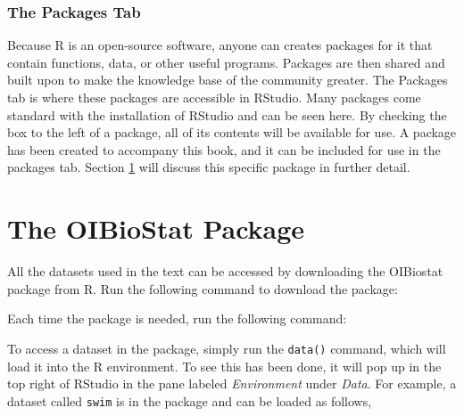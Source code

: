 \subsubsection{The Packages Tab}
Because \textsf{R} is an open-source software, anyone can creates packages for it that contain functions, data, or other useful programs.  Packages are then shared and built upon to make the knowledge base of the community greater.  The Packages tab is where these packages are accessible in \textsf{RStudio}.  Many packages come standard with the installation of \textsf{RStudio} and can be seen here.  By checking the box to the left of a package, all of its contents will be available for use.  A package has been created to accompany this book, and it can be included for use in the packages tab.  Section \ref{thepackage} will discuss this specific package in further detail.  



\section{The OIBioStat Package} \label{thepackage}
All the datasets used in the text can be accessed by downloading the OIBiostat package from \textsf{R}. Run the following command to download the package:


Each time the package is needed, run the following command: 
\begin{knitrout}
\color{fgcolor}\begin{kframe}
\begin{alltt}
\end{alltt}
\end{kframe}
\end{knitrout}

To access a dataset in the package, simply run the \texttt{data()} command, which will load it into the \textsf{R} environment.  To see this has been done, it will pop up in the top right of \textsf{RStudio} in the pane labeled \textit{Environment} under \textit{Data}.  For example, a dataset called \texttt{swim} is in the package and can be loaded as follows, 
\begin{knitrout}
\color{fgcolor}\begin{kframe}
\begin{alltt}
\end{alltt}
\end{kframe}
\end{knitrout}

